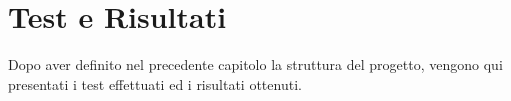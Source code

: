 
\chapter{Test e Risultati}
\label{ch:testerisultati}
Dopo aver definito nel precedente capitolo la struttura del progetto, vengono qui presentati i test effettuati ed i risultati ottenuti.